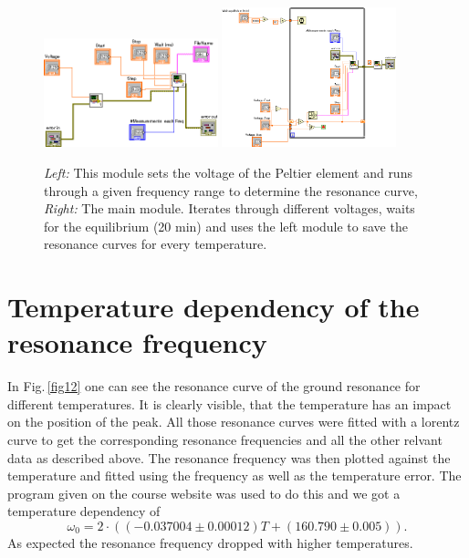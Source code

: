 \begin{figure}[h]
	\centering
	\includegraphics[width=0.45\textwidth]{figures/SetTemp__measureFreqCurved.png}
	\includegraphics[width=0.45\textwidth]{figures/Maind.png}
	\caption{\emph{Left:} This module sets the voltage of the Peltier element and runs through a given frequency range to determine the resonance curve, \emph{Right:} The main module. Iterates through different voltages, waits for the equilibrium (20 min) and uses the left module to save the resonance curves for every temperature.}
	\label{fig11}
\end{figure}

\section{Temperature dependency of the resonance frequency}
In Fig.\,\ref{fig12} one can see the resonance curve of the ground resonance for different temperatures. It is clearly visible, that the temperature has an impact on the position of the peak. All those resonance curves were fitted with a lorentz curve to get the corresponding resonance frequencies and all the other relvant data as described above. The resonance frequency was then plotted against the temperature and fitted using the frequency as well as the temperature error. The program given on the course website was used to do this and we got a temperature dependency of
\begin{equation}
	\omega_0 = 2\cdot((-0.037004\pm0.00012)T+(160.790\pm0.005)).
\end{equation}  
As expected the resonance frequency dropped with higher temperatures.

